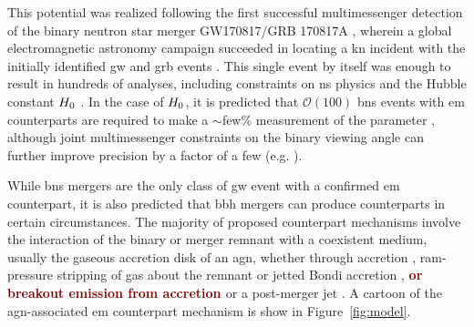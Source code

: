\documentclass[twocolumn]{aastex631}
\newcommand{\response}[1]{\textbf{\textcolor{maroon}{#1}}}
\begin{document}
This potential was realized following the first successful multimessenger detection of the binary neutron star merger GW170817/GRB 170817A \citep{abbottGravitationalWavesGammaRays2017}, wherein a global electromagnetic astronomy campaign succeeded in locating a \gls{kn} \citep{coulterSwopeSupernovaSurvey2017,Arcavi2017,Andreoni2017,Drout2017,Nicholl2017,Evans2017,Lipunov2017,Pian2017,Smartt2017,Utsumi2017,Valenti2017,kasliwal2017illuminating,troja2017x,Margutti2017,Shappee2017,soares-santosElectromagneticCounterpartBinary2017,Chornock2017,Tanvir2017} incident with the initially identified \gls{gw} and \gls{grb} events \citep{abbottMultimessengerObservationsBinary2017,Savchenko2017,Goldstein2017}. 
This single event by itself was enough to result in hundreds of analyses, including constraints on \gls{ns} physics \citep[e.g.][]{abbottGW170817MeasurementsNeutron2018} and the Hubble constant $H_{\rm 0}$ \citep{abbottGravitationalwaveStandardSiren2017}. %
In the case of $H_{\rm 0}$, it is predicted that $\mathcal{O}(100)$ \gls{bns} events with \gls{em} counterparts are required to make a $\sim$few\% measurement of the parameter \citep{chenTwoCentHubble2018}, although joint multimessenger constraints on the binary viewing angle can further improve precision by a factor of a few (e.g. \citealt{Hotokezaka2019, palmese2024standard}).

While \gls{bns} mergers are the only class of \gls{gw} event with a confirmed \gls{em} counterpart, it is also predicted that \gls{bbh} mergers can produce counterparts in certain circumstances.
The majority of proposed counterpart mechanisms involve the interaction of the binary or merger remnant with a coexistent medium, usually the gaseous accretion disk of an \gls{agn}, whether through accretion \citep{bartosRapidBrightStellarmass2017}, ram-pressure stripping of gas about the remnant or jetted Bondi accretion \citep{mckernanRampressureStrippingKicked2019}, \response{or breakout emission from accretion \citep{2021ApJ...916..111K, 2024arXiv240709945R}} or a post-merger jet \citep{tagawaObservableSignatureMerging2023,Tagawa:2023gpi}. 
A cartoon of the \gls{agn}-associated \gls{em} counterpart mechanism is show in Figure~\ref{fig:model}.
\end{document}
